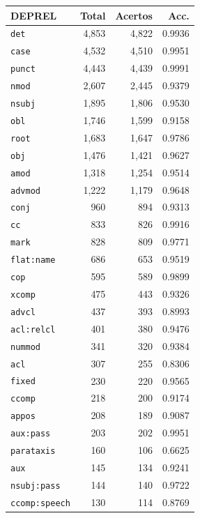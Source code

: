 \begin{table}[ht]
\centering
\footnotesize
\begin{tabular}{lrrr}
\toprule
\textbf{DEPREL} & \textbf{Total} & \textbf{Acertos} & \textbf{Acc.} \\
\midrule
\texttt{det} & 4,853 & 4,822 & 0.9936 \\
\texttt{case} & 4,532 & 4,510 & 0.9951 \\
\texttt{punct} & 4,443 & 4,439 & 0.9991 \\
\texttt{nmod} & 2,607 & 2,445 & 0.9379 \\
\texttt{nsubj} & 1,895 & 1,806 & 0.9530 \\
\texttt{obl} & 1,746 & 1,599 & 0.9158 \\
\texttt{root} & 1,683 & 1,647 & 0.9786 \\
\texttt{obj} & 1,476 & 1,421 & 0.9627 \\
\texttt{amod} & 1,318 & 1,254 & 0.9514 \\
\texttt{advmod} & 1,222 & 1,179 & 0.9648 \\
\texttt{conj} & 960 & 894 & 0.9313 \\
\texttt{cc} & 833 & 826 & 0.9916 \\
\texttt{mark} & 828 & 809 & 0.9771 \\
\texttt{flat\!:\!name} & 686 & 653 & 0.9519 \\
\texttt{cop} & 595 & 589 & 0.9899 \\
\texttt{xcomp} & 475 & 443 & 0.9326 \\
\texttt{advcl} & 437 & 393 & 0.8993 \\
\texttt{acl\!:\!relcl} & 401 & 380 & 0.9476 \\
\texttt{nummod} & 341 & 320 & 0.9384 \\
\texttt{acl} & 307 & 255 & 0.8306 \\
\texttt{fixed} & 230 & 220 & 0.9565 \\
\texttt{ccomp} & 218 & 200 & 0.9174 \\
\texttt{appos} & 208 & 189 & 0.9087 \\
\texttt{aux\!:\!pass} & 203 & 202 & 0.9951 \\
\texttt{parataxis} & 160 & 106 & 0.6625 \\
\texttt{aux} & 145 & 134 & 0.9241 \\
\texttt{nsubj\!:\!pass} & 144 & 140 & 0.9722 \\
\texttt{ccomp\!:\!speech} & 130 & 114 & 0.8769 \\

\end{tabular}
\end{table}
